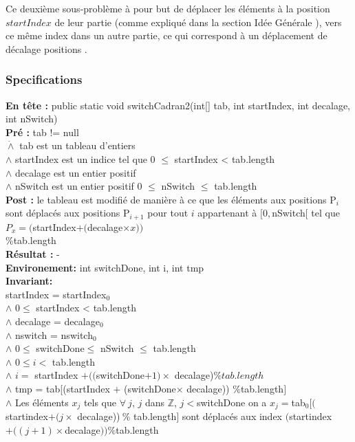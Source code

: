 Ce deuxième sous-problème à pour but de déplacer les éléments à la position $startIndex$ de leur partie (comme expliqué dans la section \og Idée Générale \fg{} ), vers ce même index dans un autre partie, ce qui correspond à un déplacement de \og décalage \fg{}  positions .

\subsubsection*{Specifications}
\noindent \textbf{En tête :} public static void switchCadran2(int[] tab, int startIndex, int decalage, int nSwitch)\\
\noindent \textbf{Pré : } tab != null \\
 	  \indent \indent $\dot{\wedge}$ tab est un tableau d'entiers\\
	  \indent \indent $\wedge$ startIndex est un indice tel que 0 $\leq$ startIndex < tab.length \\
	  \indent \indent $\wedge$ decalage est un entier positif \\
	  \indent \indent $\wedge$ nSwitch est un entier positif 0 $\leq$ nSwitch $\leq$ tab.length\\
\textbf{Post :}  le tableau est modifié de manière à ce que les éléments aux positions P$_{i}$ sont déplacés aux positions P$_{i+1}$ pour tout $i$ appartenant à $[0,$nSwitch$[$ tel que $P_{x} = ($startIndex$ + ($decalage$\times x))$\\
\%tab.length\\
\textbf{Résultat :}  - \\
\textbf{Environement: } int switchDone, int i, int tmp\\

\noindent \textbf{Invariant:}\\
\noindent startIndex = startIndex$_{0}$\\
$\wedge$ $0 \leq$ startIndex < tab.length \\
$\wedge$ decalage = decalage$_{0}$\\
$\wedge$ nswitch = nswitch$_{0}$\\
$\wedge$ $0\leq$ switchDone$ \leq$ nSwitch $\leq$ tab.length\\
$\wedge$ $0\leq i <$ tab.length\\
$\wedge$ $i =$ startIndex $+ (($switchDone$+1)\times$ decalage)$ \% tab.length$\\
$\wedge$ tmp = tab[(startIndex $+$ (switchDone$\times$ decalage))  $\% $tab.length$]$\\
$\wedge$ Les éléments $x_{j}$ tels que $\forall\ j$, $j$ dans $\mathbb{Z}$, $j<$switchDone on a $x_{j}=$tab$_{0}[($startindex$ + (j\times$ decalage))$\ \%$ tab.length$]$ sont déplacés aux index $($startindex$ + ((j+1)\times  $decalage$))\% $tab.length\\

